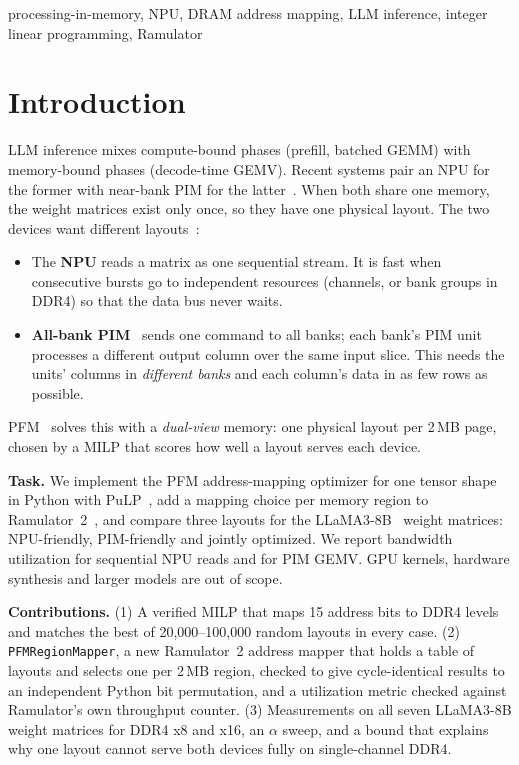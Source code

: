 \documentclass[conference]{IEEEtran}
\begin{document}
\begin{IEEEkeywords}
processing-in-memory, NPU, DRAM address mapping, LLM inference, integer linear programming, Ramulator
\end{IEEEkeywords}

\section{Introduction}
LLM inference mixes compute-bound phases (prefill, batched GEMM) with memory-bound phases (decode-time GEMV). Recent systems pair an NPU for the former with near-bank PIM for the latter~\cite{heo2024neupims,seo2024ianus,park2024attacc}. When both share one memory, the weight matrices exist only once, so they have one physical layout. The two devices want different layouts~\cite{zhao2026pfm,seo2025facil}:
\begin{itemize}
\item The \textbf{NPU} reads a matrix as one sequential stream. It is fast when consecutive bursts go to independent resources (channels, or bank groups in DDR4) so that the data bus never waits.
\item \textbf{All-bank PIM}~\cite{lee2021hbmpim,he2020newton} sends one command to all banks; each bank's PIM unit processes a different output column over the same input slice. This needs the units' columns in \emph{different banks} and each column's data in as few rows as possible.
\end{itemize}
PFM~\cite{zhao2026pfm} solves this with a \emph{dual-view} memory: one physical layout per 2\,MB page, chosen by a MILP that scores how well a layout serves each device.

\textbf{Task.} We implement the PFM address-mapping optimizer for one tensor shape in Python with PuLP~\cite{mitchell2011pulp}, add a mapping choice per memory region to Ramulator~2~\cite{luo2024ramulator2}, and compare three layouts for the LLaMA3-8B~\cite{llama3} weight matrices: NPU-friendly, PIM-friendly and jointly optimized. We report bandwidth utilization for sequential NPU reads and for PIM GEMV. GPU kernels, hardware synthesis and larger models are out of scope.

\textbf{Contributions.}
(1) A verified MILP that maps 15 address bits to DDR4 levels and matches the best of 20,000--100,000 random layouts in every case.
(2) \texttt{PFMRegionMapper}, a new Ramulator~2 address mapper that holds a table of layouts and selects one per 2\,MB region, checked to give cycle-identical results to an independent Python bit permutation, and a utilization metric checked against Ramulator's own throughput counter.
(3) Measurements on all seven LLaMA3-8B weight matrices for DDR4 x8 and x16, an $\alpha$ sweep, and a bound that explains why one layout cannot serve both devices fully on single-channel DDR4.
\end{document}
